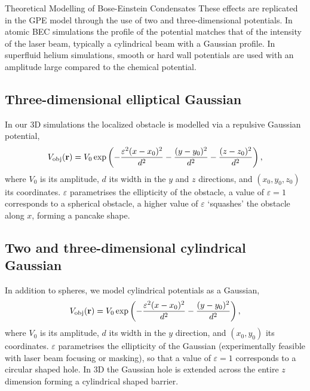 \begin{chapter}{\label{cha:theoretical_model}Theoretical Modelling of Bose-Einstein Condensates}
These effects are replicated in the GPE model through the use of two and three-dimensional potentials. In atomic BEC simulations the profile of the potential matches that of the intensity of the laser beam, typically a cylindrical beam with a Gaussian profile. In superfluid helium simulations, smooth or hard wall potentials are used with an amplitude large compared to the chemical potential.
\subsection{\label{section:3dobjpotential} Three-dimensional elliptical Gaussian}
In our 3D simulations the localized obstacle is modelled via a repulsive Gaussian potential,
\begin{equation}
V_{\mathrm{obj}}({\bf r})=V_0 \exp \left( -\frac{\varepsilon^2(x-x_0)^2}{d^2} -\frac{(y-y_0)^2}{d^2}-\frac{(z-z_0)^2}{d^2}\right),
\label{eq:potential3D}
\end{equation}
where  $V_0$ is its amplitude, $d$ its width in the $y$ and $z$ directions, and $(x_0,y_0,z_0)$ its coordinates. $\varepsilon$ parametrises the ellipticity of the obstacle, a value of $\varepsilon=1$ corresponds to a spherical obstacle, a higher value of $\varepsilon$ `squashes' the obstacle along $x$, forming a pancake shape.

\subsection{\label{section:3dcylinderpotential} Two and three-dimensional cylindrical Gaussian}
In addition to spheres, we model cylindrical potentials as a Gaussian,
\begin{equation}
V_{\mathrm{obj}}({\bf r})=V_0 \exp \left( -\frac{\varepsilon^2(x-x_0)^2}{d^2} -\frac{(y-y_0)^2}{d^2}\right),
\label{eq:potentialcylinder}
\end{equation}
where  $V_0$ is its amplitude, $d$ its width in the $y$ direction, and $(x_0,y_0)$ its coordinates. $\varepsilon$ parametrises the ellipticity of the Gaussian (experimentally feasible with laser beam focusing or masking), so that a value of $\varepsilon=1$ corresponds to a circular shaped hole. In 3D the Gaussian hole is extended across the entire $z$ dimension forming a cylindrical shaped barrier.

\end{chapter}
